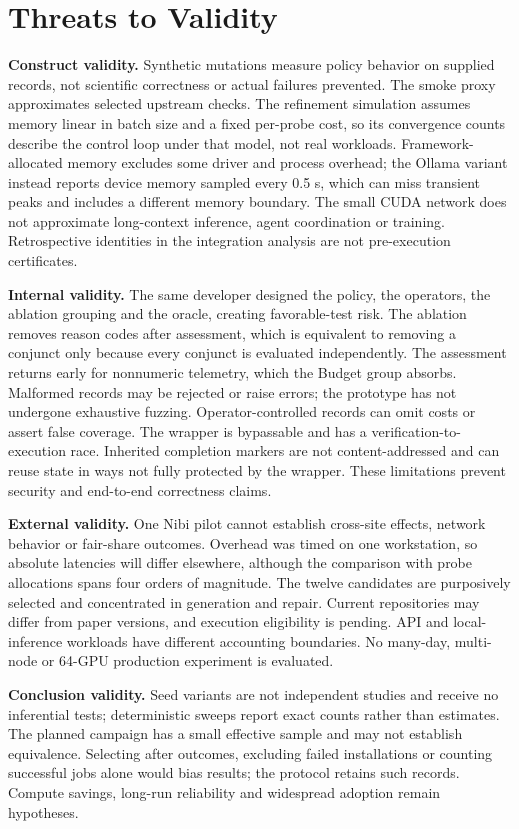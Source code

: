 \section{Threats to Validity}\label{sec:threats}
\textbf{Construct validity.} Synthetic mutations measure policy behavior on supplied records, not scientific correctness or actual failures prevented. The smoke proxy approximates selected upstream checks. The refinement simulation assumes memory linear in batch size and a fixed per-probe cost, so its convergence counts describe the control loop under that model, not real workloads. Framework-allocated memory excludes some driver and process overhead; the Ollama variant instead reports device memory sampled every 0.5 s, which can miss transient peaks and includes a different memory boundary. The small CUDA network does not approximate long-context inference, agent coordination or training. Retrospective identities in the integration analysis are not pre-execution certificates.

\textbf{Internal validity.} The same developer designed the policy, the operators, the ablation grouping and the oracle, creating favorable-test risk. The ablation removes reason codes after assessment, which is equivalent to removing a conjunct only because every conjunct is evaluated independently. The assessment returns early for nonnumeric telemetry, which the Budget group absorbs. Malformed records may be rejected or raise errors; the prototype has not undergone exhaustive fuzzing. Operator-controlled records can omit costs or assert false coverage. The wrapper is bypassable and has a verification-to-execution race. Inherited completion markers are not content-addressed and can reuse state in ways not fully protected by the wrapper. These limitations prevent security and end-to-end correctness claims.

\textbf{External validity.} One Nibi pilot cannot establish cross-site effects, network behavior or fair-share outcomes. Overhead was timed on one workstation, so absolute latencies will differ elsewhere, although the comparison with probe allocations spans four orders of magnitude. The twelve candidates are purposively selected and concentrated in generation and repair. Current repositories may differ from paper versions, and execution eligibility is pending. API and local-inference workloads have different accounting boundaries. No many-day, multi-node or 64-GPU production experiment is evaluated.

\textbf{Conclusion validity.} Seed variants are not independent studies and receive no inferential tests; deterministic sweeps report exact counts rather than estimates. The planned campaign has a small effective sample and may not establish equivalence. Selecting after outcomes, excluding failed installations or counting successful jobs alone would bias results; the protocol retains such records. Compute savings, long-run reliability and widespread adoption remain hypotheses.

